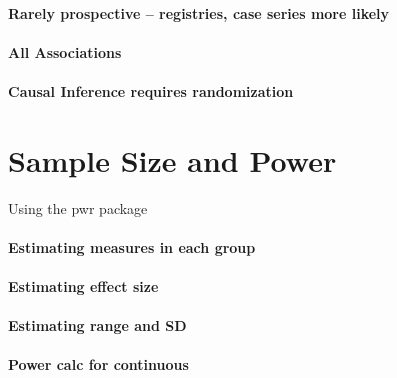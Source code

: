 \documentclass[
]{book}
\begin{document}
\hypertarget{rarely-prospective-registries-case-series-more-likely}{%
\subsubsection{Rarely prospective -- registries, case series more likely}\label{rarely-prospective-registries-case-series-more-likely}}

\hypertarget{all-associations}{%
\subsubsection{All Associations}\label{all-associations}}

\hypertarget{causal-inference-requires-randomization}{%
\subsubsection{Causal Inference requires randomization}\label{causal-inference-requires-randomization}}

\hypertarget{sample-size-and-power}{%
\chapter{Sample Size and Power}\label{sample-size-and-power}}

Using the pwr package

\hypertarget{estimating-measures-in-each-group}{%
\subsubsection{Estimating measures in each group}\label{estimating-measures-in-each-group}}

\hypertarget{estimating-effect-size}{%
\subsubsection{Estimating effect size}\label{estimating-effect-size}}

\hypertarget{estimating-range-and-sd}{%
\subsubsection{Estimating range and SD}\label{estimating-range-and-sd}}

\hypertarget{power-calc-for-continuous}{%
\subsubsection{Power calc for continuous}\label{power-calc-for-continuous}}
\end{document}
